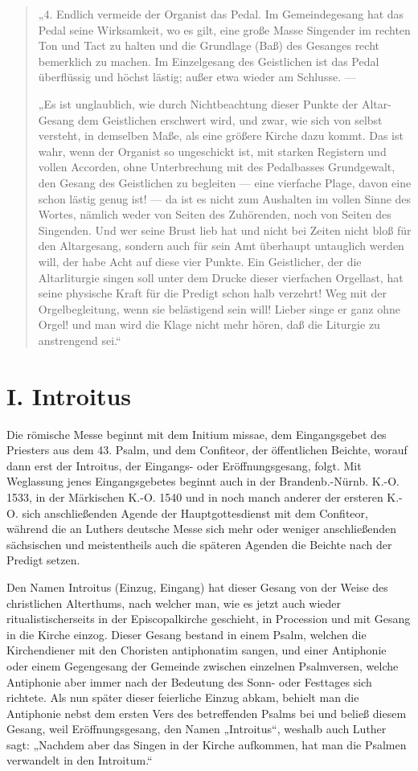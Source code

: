 \begin{quote}
„4. Endlich vermeide der Organist das Pedal. Im Gemeindegesang hat das Pedal seine Wirksamkeit, wo es gilt, eine große Masse Singender im rechten Ton und Tact zu halten und die Grundlage (Baß) des Gesanges recht bemerklich zu machen. Im Einzelgesang des Geistlichen ist das Pedal überflüssig und höchst lästig; außer etwa wieder am Schlusse. —

„Es ist unglaublich, wie durch Nichtbeachtung dieser Punkte der Altar-Gesang dem Geistlichen erschwert wird, und zwar, wie sich von selbst versteht, in demselben Maße, als eine größere Kirche dazu kommt. Das ist wahr, wenn der Organist so ungeschickt ist, mit starken Registern und vollen Accorden, ohne Unterbrechung mit des Pedalbasses Grundgewalt, den Gesang des Geistlichen zu begleiten — eine vierfache Plage, davon eine schon lästig genug ist! — da ist es nicht zum Aushalten im vollen Sinne des Wortes, nämlich weder von Seiten des Zuhörenden, noch von Seiten des Singenden. Und wer seine Brust lieb hat und nicht bei Zeiten nicht bloß für den Altargesang, sondern auch für sein Amt überhaupt untauglich werden will, der habe Acht auf diese vier Punkte. Ein Geistlicher, der die Altarliturgie singen soll unter dem Drucke dieser vierfachen Orgellast, hat seine physische Kraft für die Predigt schon halb verzehrt! Weg mit der Orgelbegleitung, wenn sie belästigend sein will! Lieber singe er ganz ohne Orgel! und man wird die Klage nicht mehr hören, daß die Liturgie zu anstrengend sei.“
\end{quote}

\chapter{I. Introitus}


Die römische Messe beginnt mit dem Initium missae, dem Eingangsgebet des Priesters aus dem 43. Psalm, und dem Confiteor, der öffentlichen Beichte, worauf dann erst der Introitus, der Eingangs- oder Eröffnungsgesang, folgt. Mit Weglassung jenes Eingangsgebetes beginnt auch in der Brandenb.-Nürnb. K.-O. 1533, in der Märkischen K.-O. 1540 und in noch manch anderer der ersteren K.-O. sich anschließenden Agende der Hauptgottesdienst mit dem Confiteor, während die an Luthers deutsche Messe sich mehr oder weniger anschließenden sächsischen und meistentheils auch die späteren Agenden die Beichte nach der Predigt setzen.

Den Namen Introitus (Einzug, Eingang) hat dieser Gesang von der Weise des christlichen Alterthums, nach welcher man, wie es jetzt auch wieder ritualistischerseits in der Episcopalkirche geschieht, in Procession und mit Gesang in die Kirche einzog. Dieser Gesang bestand in einem Psalm, welchen die Kirchendiener mit den Choristen antiphonatim sangen, und einer Antiphonie oder einem Gegengesang der Gemeinde zwischen einzelnen Psalmversen, welche Antiphonie aber immer nach der Bedeutung des Sonn- oder Festtages sich richtete. Als nun später dieser feierliche Einzug abkam, behielt man die Antiphonie nebst dem ersten Vers des betreffenden Psalms bei und beließ diesem Gesang, weil Eröffnungsgesang, den Namen „Introitus“, weshalb auch Luther sagt: „Nachdem aber das Singen in der Kirche aufkommen, hat man die Psalmen verwandelt in den Introitum.“

